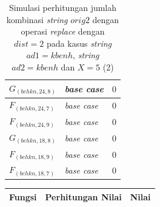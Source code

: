 \begin{appendices}
\begin{table}[H]
\begin{tabular} {|p{3cm}|p{5cm}|p{1cm}|}
  		$ G_{(behkn, 24, 8)} $ & \textit{base case} & $ 0 $ \\ \hline
  		$ F_{(behkn, 24, 7)} $ & \textit{base case} & $ 0 $ \\ \hline
  		$ F_{(behkn, 24, 9)} $ & \textit{base case} & $ 0 $ \\ \hline
  		$ G_{(behkn, 18, 8)} $ & \textit{base case} & $ 0 $ \\ \hline
  		$ F_{(behkn, 18, 9)} $ & \textit{base case} & $ 0 $ \\ \hline
  		$ F_{(behkn, 18, 7)} $ & \textit{base case} & $ 0 $ \\ \hline
  		
  	\end{tabular}\caption{Simulasi perhitungan jumlah kombinasi \textit{string} $ orig2 $ dengan operasi \textit{replace} dengan $ dist= 2  $ pada kasus \textit{string} $ ad1=kbenh $, \textit{string} $ ad2=kbenh $ dan $ X=5 $ (2)}
  	\label{tab:g_3_orig2_2_2}
  \end{table}
  \begin{table}[H]
  	\centering
  	\begin{tabular} {|p{3cm}|p{5cm}|p{1cm}|} \hline
  		Fungsi & Perhitungan Nilai & Nilai \\ \hline
  		

\end{tabular}
\end{table}
\end{appendices}
